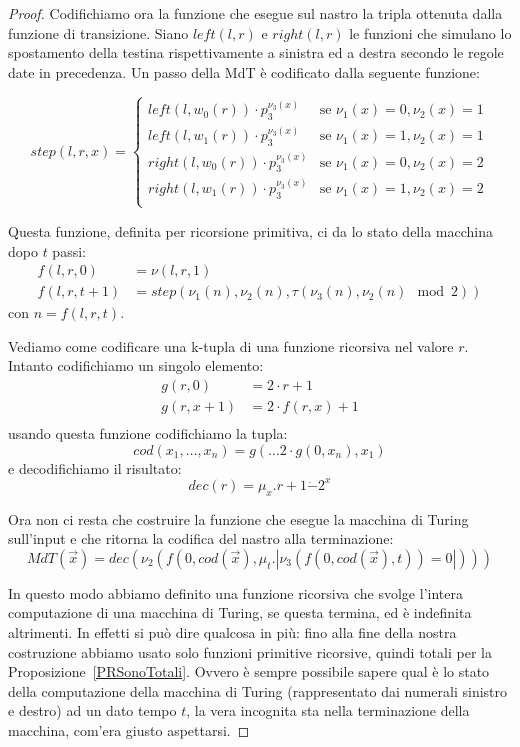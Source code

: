 \begin{proof}
Codifichiamo ora la funzione che esegue sul nastro la tripla ottenuta dalla
funzione di transizione. Siano $left(l,r)$ e $right(l,r)$ le funzioni che
simulano lo spostamento della testina rispettivamente a sinistra ed a destra
secondo le regole date in precedenza. Un passo della MdT è codificato dalla
seguente funzione:

$$step(l,r,x) = \left\{
\begin{array}{ll}
left(l, w_0(r)) \cdot p_3^{\nu_3(x)} & \text{se }\nu_1(x) = 0, \nu_2(x) = 1\\
left(l, w_1(r)) \cdot p_3^{\nu_3(x)} & \text{se }\nu_1(x) = 1, \nu_2(x) = 1\\
right(l, w_0(r)) \cdot p_3^{\nu_3(x)} & \text{se }\nu_1(x) = 0, \nu_2(x) = 2\\
right(l, w_1(r)) \cdot p_3^{\nu_3(x)} & \text{se }\nu_1(x) = 1, \nu_2(x) = 2\\
\end{array}
\right.$$

Questa funzione, definita per ricorsione primitiva, ci da lo stato della
macchina dopo $t$ passi:
\begin{align*}
f(l,r,0) &= \nu(l,r,1)\\
f(l,r,t+1) &= step(\nu_1(n), \nu_2(n), \tau(\nu_3(n), \nu_2(n) \mod 2) )
\end{align*}
con $n = f(l,r,t)$.

Vediamo come codificare una k-tupla di una funzione ricorsiva nel valore $r$.
Intanto codifichiamo un singolo elemento:
\begin{align*}
g(r,0) &= 2\cdot r + 1\\ 
g(r,x+1) &= 2\cdot f(r, x) + 1\\
\end{align*}
usando questa funzione codifichiamo la tupla:
$$cod(x_1, \dots, x_n) = g(\dots 2\cdot g(0, x_n), x_1)$$
e decodifichiamo il risultato:
$$dec(r) = \mu_x.r+1\dot{-}2^x$$

Ora non ci resta che costruire la funzione che esegue la macchina di Turing
sull'input e che ritorna la codifica del nastro alla terminazione:
$$MdT(\overrightarrow{x}) = dec(\nu_2(f(0,cod(\overrightarrow{x}),\mu_t .
|\nu_3(f(0,cod(\overrightarrow{x}),t)) = 0|)))$$

In questo modo abbiamo definito una funzione ricorsiva che svolge
l'intera computazione di una macchina di Turing, se questa termina, ed
è indefinita altrimenti. In effetti si può dire qualcosa in più: fino
alla fine della nostra costruzione abbiamo usato solo funzioni
primitive ricorsive, quindi totali per la
Proposizione~\ref{PRSonoTotali}. Ovvero è sempre possibile sapere qual
è lo stato della computazione della macchina di Turing (rappresentato
dai numerali sinistro e destro) ad un dato tempo $t$, la vera
incognita sta nella terminazione della macchina, com'era giusto
aspettarsi.


\end{proof}
